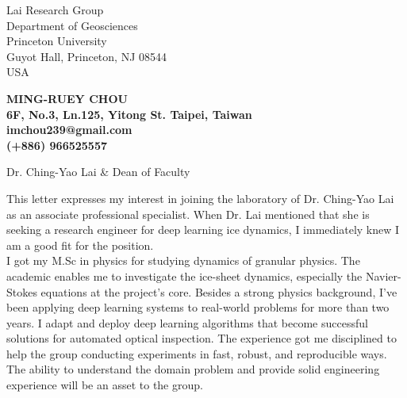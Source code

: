 \documentclass[12pt]{letter} %
\begin{document}

\begin{letter}{
Lai Research Group\\
Department of Geosciences\\
Princeton University\\
Guyot Hall, Princeton, NJ 08544\\
USA
} 


\begin{center}
\large\bf MING-RUEY CHOU\\ %
6F, No.3, Ln.125, Yitong St. Taipei, Taiwan\\imchou239@gmail.com\\(+886) 966525557%
\end{center} 
\vfill

\signature{Ming-Ruey Chou} %


\opening{Dr. Ching-Yao Lai \& Dean of Faculty} 

This letter expresses my interest in joining the laboratory of Dr. Ching-Yao Lai as an associate professional specialist.
When Dr. Lai mentioned that she is seeking a research engineer for deep learning ice dynamics, I immediately knew I am a good fit for the position.\\

I got my M.Sc in physics for studying dynamics of granular physics.
The academic enables me to investigate the ice-sheet dynamics, especially the Navier-Stokes equations at the project's core.
Besides a strong physics background, I've been applying deep learning systems to real-world problems for more than two years.
I adapt and deploy deep learning algorithms that become successful solutions for automated optical inspection.
The experience got me disciplined to help the group conducting experiments in fast, robust, and reproducible ways.
The ability to understand the domain problem and provide solid engineering experience will be an asset to the group.\\


\end{letter}
\end{document}
